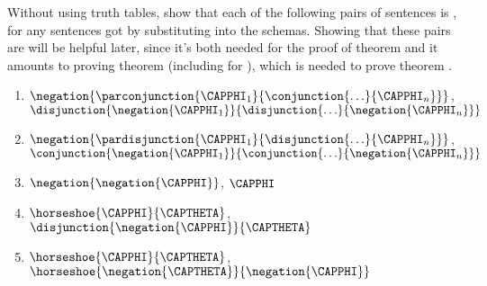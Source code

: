 Without using truth tables, show that each of the following pairs of sentences is , for any sentences got by substituting into the schemas. 
Showing that these pairs are  will be helpful later, since it's both needed for the proof of theorem  and it amounts to proving theorem  (including for ), which is needed to prove theorem .
\begin{enumerate}

\item $\negation{\parconjunction{\CAPPHI_1}{\conjunction{\ldots}{\CAPPHI_{\integer{n}}}}}$, $\disjunction{\negation{\CAPPHI_1}}{\disjunction{\ldots}{\negation{\CAPPHI_{\integer{n}}}}}$

 
\item $\negation{\pardisjunction{\CAPPHI_1}{\disjunction{\ldots}{\CAPPHI_{\integer{n}}}}}$, $\conjunction{\negation{\CAPPHI_1}}{\conjunction{\ldots}{\negation{\CAPPHI_{\integer{n}}}}}$ 
 
 
\item $\negation{\negation{\CAPPHI}}$, $\CAPPHI$


\item $\horseshoe{\CAPPHI}{\CAPTHETA}$, $\disjunction{\negation{\CAPPHI}}{\CAPTHETA}$ 

 
\item $\horseshoe{\CAPPHI}{\CAPTHETA}$, $\horseshoe{\negation{\CAPTHETA}}{\negation{\CAPPHI}}$ 

 

\end{enumerate}
